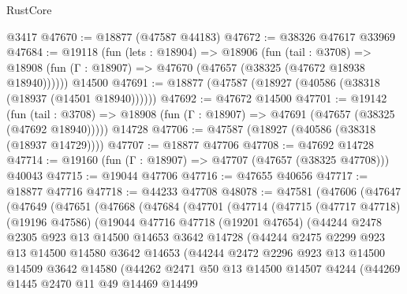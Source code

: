 \begin{lexlean}{RustCore}
\begin{coremodule}
    @3417
@47670 := @18877 (@47587 @44183)
@47672 := @38326 @47617 @33969
@47684 := @19118
    (fun (lets : @18904) =>
    @18906
      (fun (tail : @3708) =>
      @18908 (fun (Γ : @18907) => @47670 (@47657 (@38325 (@47672 @18938 @18940))))))
    @14500
@47691 := @18877 (@47587 (@18927 (@40586 (@38318 (@18937 (@14501 @18940))))))
@47692 := @47672 @14500
@47701 := @19142
    (fun (tail : @3708) => @18908 (fun (Γ : @18907) => @47691 (@47657 (@38325 (@47692 @18940)))))
    @14728
@47706 := @47587 (@18927 (@40586 (@38318 (@18937 @14729))))
@47707 := @18877 @47706
@47708 := @47692 @14728
@47714 := @19160 (fun (Γ : @18907) => @47707 (@47657 (@38325 @47708))) @40043
@47715 := @19044 @47706
@47716 := @47655 @40656
@47717 := @18877 @47716
@47718 := @44233 @47708
@48078 := @47581
    (@47606
      (@47647
        (@47649
          (@47651
            (@47668
              (@47684
                (@47701
                  (@47714
                    (@47715
                      (@47717 @47718)
                      (@19196 @47586)
                      (@19044
                        @47716
                        @47718
                        (@19201 @47654)
                        (@44244
                          @2478
                          @2305
                          @923
                          @13
                          @14500
                          @14653
                          @3642
                          @14728
                          (@44244
                            @2475
                            @2299
                            @923
                            @13
                            @14500
                            @14580
                            @3642
                            @14653
                            (@44244
                              @2472
                              @2296
                              @923
                              @13
                              @14500
                              @14509
                              @3642
                              @14580
                              (@44262
                                @2471
                                @50
                                @13
                                @14500
                                @14507
                                @4244
                                (@44269
                                  @1445
                                  @2470
                                  @11
                                  @49
                                  @14469
                                  @14499

\end{coremodule}
\end{lexlean}
